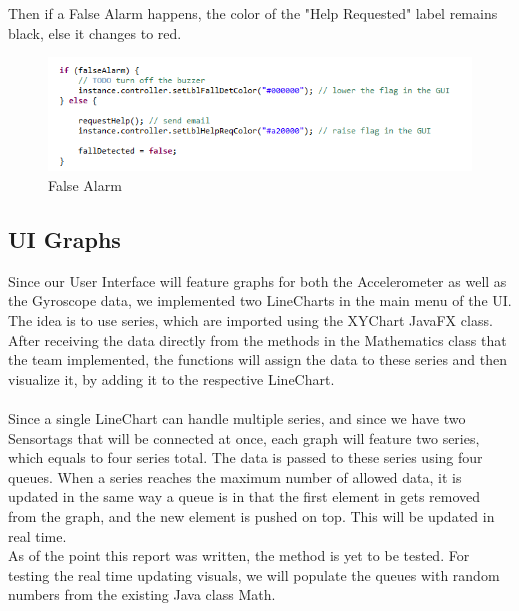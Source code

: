 \documentclass[12pt]{article}
\begin{document}
Then if a False Alarm happens, the color of the "Help Requested" label remains black, else it changes to red.
\FloatBarrier
\begin{figure}[h]
	\centering
	\includegraphics[scale=0.80]{images/UI_3.png}
	\caption{False Alarm}
	\label{img:UI_3}
\end{figure}
\FloatBarrier

\vskip 1cm
\subsection{UI Graphs}
Since our User Interface will feature graphs for both the Accelerometer as well as the Gyroscope data, we implemented two LineCharts in the main menu of the UI. The idea is to use series, which are imported using the XYChart JavaFX class. After receiving the data directly from the methods in the Mathematics class that the team implemented, the functions will assign the data to these series and then visualize it, by adding it to the respective LineChart.
\\\\Since a single LineChart can handle multiple series, and since we have two Sensortags that will be connected at once, each graph will feature two series, which equals to four series total. The data is passed to these series using four queues. When a series reaches the maximum number of allowed data, it is updated in the same way a queue is in that the first element in gets removed from the graph, and the new element is pushed on top. This will be updated in real time.\\
As of the point this report was written, the method is yet to be tested. For testing the real time updating visuals, we will populate the queues with random numbers from the existing Java class Math.
\end{document}
